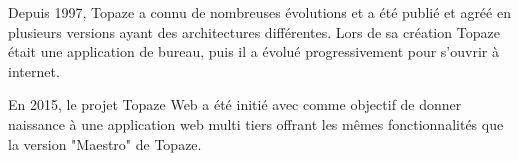 Depuis 1997, Topaze a connu de nombreuses évolutions et a été publié et agréé en plusieurs versions ayant des architectures différentes. Lors de sa création Topaze était une application de bureau, puis il a évolué progressivement pour s'ouvrir à internet.
 
En 2015, le projet Topaze Web a été initié avec comme objectif de donner naissance à une application web multi tiers offrant les mêmes fonctionnalités que la version "Maestro" de Topaze.


